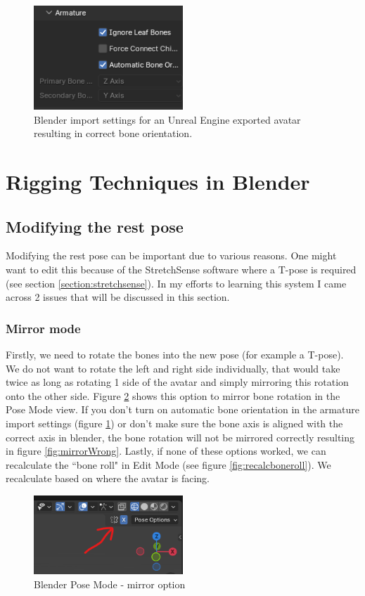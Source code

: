 \documentclass{uva-inf-article}
\begin{document}
\begin{figure}[hbt!]
    \centering
    \includegraphics[width=0.5\textwidth]{imgs/importsettings.png}
    \caption{Blender import settings for an Unreal Engine exported avatar resulting in correct bone orientation.}
    \label{fig:correctimportsettings}
\end{figure}

\section{Rigging Techniques in Blender}
\subsection{Modifying the rest pose}
Modifying the rest pose can be important due to various reasons. One might want to edit this because of the StretchSense software where a T-pose is required (see section \ref{section:stretchsense}). In my efforts to learning this system I came across 2 issues that will be discussed in this section.

\subsubsection{Mirror mode}
Firstly, we need to rotate the bones into the new pose (for example a T-pose). We do not want to rotate the left and right side individually, that would take twice as long as rotating 1 side of the avatar and simply mirroring this rotation onto the other side. Figure \ref{fig:mirrorOption} shows this option to mirror bone rotation in the Pose Mode view.
If you don't turn on automatic bone orientation in the armature import settings (figure \ref{fig:correctimportsettings}) or don't make sure the bone axis is aligned with the correct axis in blender, the bone rotation will not be mirrored correctly resulting in figure \ref{fig:mirrorWrong}. Lastly, if none of these options worked, we can recalculate the ``bone roll" in Edit Mode (see figure \ref{fig:recalcboneroll}). We recalculate based on where the avatar is facing.
\begin{figure}[hbt!]
    \centering
    \includegraphics[width=0.5\textwidth]{imgs/mirrormode.png}
    \caption{Blender Pose Mode - mirror option}
    \label{fig:mirrorOption}
\end{figure}
\end{document}
